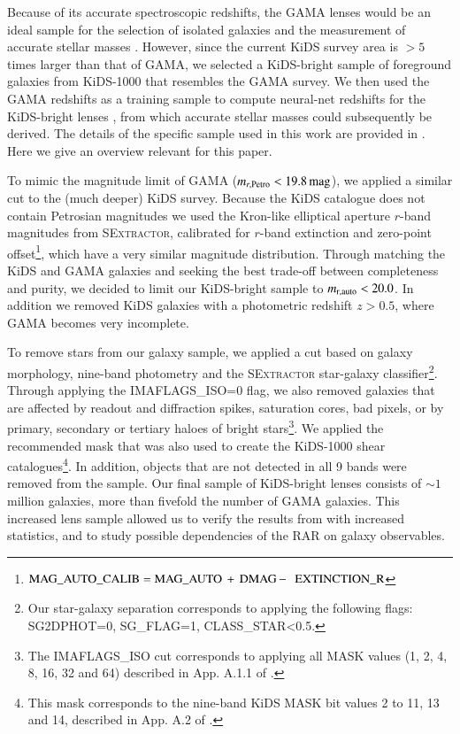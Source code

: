 \documentclass{aa}
\newcommand{\magn}{\,{\rm mag} }
\newcommand{\un}[1]{_{\rm #1}}
\begin{document}
Because of its accurate spectroscopic redshifts, the GAMA lenses would be an ideal sample for the selection of isolated galaxies and the measurement of accurate stellar masses \cite[as was done in][]{brouwer2017}. However, since the current KiDS survey area is $>5$ times larger than that of GAMA, we selected a KiDS-bright sample of foreground galaxies from KiDS-1000 that resembles the GAMA survey. We then used the GAMA redshifts as a training sample to compute neural-net redshifts for the KiDS-bright lenses \cite[see e.g.][]{bilicki2018}, from which accurate stellar masses could subsequently be derived. The details of the specific sample used in this work are provided in \cite{bilicki2021}. Here we give an overview relevant for this paper.

To mimic the magnitude limit of GAMA ($m_{r, {\rm Petro}}<19.8 \magn$), we applied a similar cut to the (much deeper) KiDS survey. Because the KiDS catalogue does not contain Petrosian magnitudes we used the Kron-like elliptical aperture $r$-band magnitudes from \textsc{SExtractor}, calibrated for $r$-band extinction and zero-point offset\footnote{${\rm MAG\_AUTO\_CALIB = MAG\_AUTO \, + \, DMAG \, - \,}$ ${\rm EXTINCTION\_R}$}, which have a very similar magnitude distribution. Through matching the KiDS and GAMA galaxies and seeking the best trade-off between completeness and purity, we decided to limit our KiDS-bright sample to $m\un{r,auto}<20.0$. In addition we removed KiDS galaxies with a photometric redshift $z>0.5$, where GAMA becomes very incomplete.

To remove stars from our galaxy sample, we applied a cut based on galaxy morphology, nine-band photometry and the \textsc{SExtractor} star-galaxy classifier\footnote{Our star-galaxy separation corresponds to applying the following flags: SG2DPHOT=0, SG\_FLAG=1, CLASS\_STAR<0.5.}. Through applying the IMAFLAGS\_ISO=0 flag, we also removed galaxies that are affected by readout and diffraction spikes, saturation cores, bad pixels, or by primary, secondary or tertiary haloes of bright stars\footnote{The IMAFLAGS\_ISO cut corresponds to applying all MASK values (1, 2, 4, 8, 16, 32 and 64) described in App. A.1.1 of \cite{kuijken2019}.}. We applied the recommended mask that was also used to create the KiDS-1000 shear catalogues\footnote{This mask corresponds to the nine-band KiDS MASK bit values 2 to 11, 13 and 14, described in App. A.2 of \cite{kuijken2019}.}. In addition, objects that are not detected in all 9 bands were removed from the sample. Our final sample of KiDS-bright lenses consists of $\sim1$ million galaxies, more than fivefold the number of GAMA galaxies. This increased lens sample allowed us to verify the results from \cite{brouwer2017} with increased statistics, and to study possible dependencies of the RAR on galaxy observables.
\end{document}
